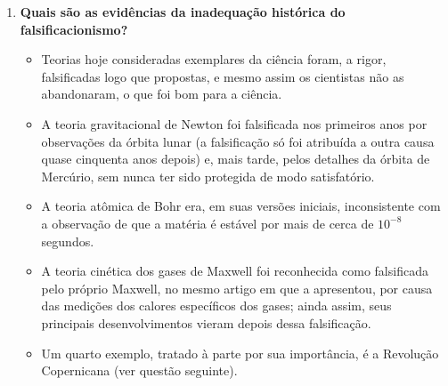 \documentclass[10pt,a4paper]{extarticle}
\begin{document}
\begin{enumerate}[resume, label=\textbf{\arabic*.}, itemsep=10pt]
\item \textbf{Quais são as evidências da inadequação histórica do falsificacionismo?}
\begin{itemize}
  \item Teorias hoje consideradas exemplares da ciência foram, a rigor, falsificadas logo que propostas, e mesmo assim os cientistas não as abandonaram, o que foi bom para a ciência.
  \item A teoria gravitacional de Newton foi falsificada nos primeiros anos por observações da órbita lunar (a falsificação só foi atribuída a outra causa quase cinquenta anos depois) e, mais tarde, pelos detalhes da órbita de Mercúrio, sem nunca ter sido protegida de modo satisfatório.
  \item A teoria atômica de Bohr era, em suas versões iniciais, inconsistente com a observação de que a matéria é estável por mais de cerca de $10^{-8}$ segundos.
  \item A teoria cinética dos gases de Maxwell foi reconhecida como falsificada pelo próprio Maxwell, no mesmo artigo em que a apresentou, por causa das medições dos calores específicos dos gases; ainda assim, seus principais desenvolvimentos vieram depois dessa falsificação.
  \item Um quarto exemplo, tratado à parte por sua importância, é a Revolução Copernicana (ver questão seguinte).
\end{itemize}


\end{enumerate}
\end{document}
